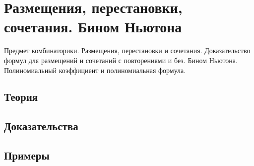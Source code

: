 
\section{Размещения, перестановки, сочетания. Бином Ньютона}
\label{sec:2.2.04-combinatorics-basics}

\begin{ticket}
Предмет комбинаторики. Размещения, перестановки и сочетания. Доказательство формул для размещений и сочетаний с повторениями и без. Бином Ньютона. Полиномиальный коэффициент и полиномиальная формула.
\end{ticket}

\subsection*{Теория}

\subsection*{Доказательства}

\subsection*{Примеры}

